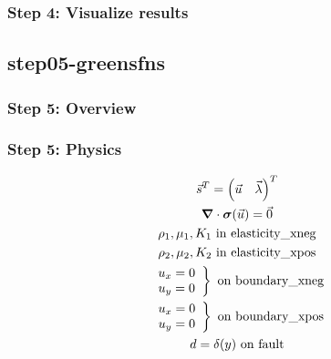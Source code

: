 \documentclass[aspectratio=169]{beamer}
\begin{document}
\begin{frame}
  \frametitle{Step 4: Visualize results}

    
\end{frame}


\subsection{step05-greensfns}

\begin{frame}
  \frametitle{Step 5: Overview}

      
\end{frame}

\begin{frame}
  \frametitle{Step 5: Physics}
  \summary{}

  \begin{minipage}{0.35\textwidth}
    {\scriptsize
    \begin{gather*}
    \vec{s}^T = \left( \vec{u} \quad \vec{\lambda} \right)^T \\
    \bm{\nabla} \cdot \bm{\sigma}(\vec{u}) = \vec{0} \\
    \rho_1, \mu_1, K_1 \text{ in elasticity\_xneg} \\ 
    \rho_2, \mu_2, K_2 \text{ in elasticity\_xpos} \\ 
    \left. \begin{array}{c} u_x = 0 \\ u_y = 0 \end{array}\right\} \text{ on boundary\_xneg} \\
    \left. \begin{array}{c} u_x = 0 \\ u_y = 0 \end{array}\right\} \text{ on boundary\_xpos} \\
    d = \delta(y) \text{ on fault}
    \end{gather*}}
  \end{minipage}
  \hfill
  \begin{minipage}{0.60\textwidth}
  \end{minipage}
      
\end{frame}
\end{document}
